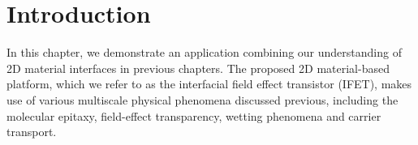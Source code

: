 

\section{Introduction}
\label{sec:small-introduction}

In this chapter, we demonstrate an application combining our
understanding of 2D material interfaces in previous chapters.  The
proposed 2D material-based platform, which we refer to as the
interfacial field effect transistor (IFET), makes use of various
multiscale physical phenomena discussed previous, including the
molecular epitaxy, field-effect transparency, wetting phenomena and
carrier transport.

